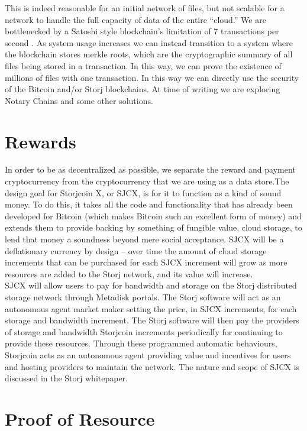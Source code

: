 \documentclass[a4paper,12pt]{article}
\begin{document}
This is indeed reasonable for an initial network of files, but not scalable for a network to handle the full capacity of data of the entire “cloud.” We are bottlenecked by a Satoshi style blockchain’s limitation of 7 transactions per second \cite{14}. As system usage increases we can instead transition to a system where the blockchain stores merkle roots, which are the cryptographic summary of all files being stored in a transaction. In this way, we can prove the existence of millions of files with one transaction. In this way we can directly use the security of the Bitcoin and/or Storj blockchains. At time of writing we are exploring Notary Chains \cite{15} and some other solutions. 

\section*{Rewards}

In order to be as decentralized as possible, we separate the reward and payment cryptocurrency from the cryptocurrency that we are using as a data store.The design goal for Storjcoin X, or SJCX, is for it to function as a kind of sound money.  To do this, it takes all the code and functionality that has already been developed for Bitcoin (which makes Bitcoin such an excellent form of money) and extends them to provide backing by something of fungible value, cloud storage, to lend that money a soundness beyond mere social acceptance. SJCX will be a deflationary currency by design -- over time the amount of cloud storage increments that can be purchased for each SJCX increment will grow as more resources are added to the Storj network, and its value will increase.\\

SJCX will allow users to pay for bandwidth and storage on the Storj distributed storage network through Metadisk portals.  The Storj software will act as an autonomous agent market maker setting the price, in SJCX increments, for each storage and bandwidth increment.  The Storj software will then pay the providers of storage and bandwidth Storjcoin increments periodically for continuing to provide these resources. Through these programmed automatic behaviours, Storjcoin acts as an autonomous agent providing value and incentives for users and hosting providers to maintain the network. The nature and scope of SJCX is discussed in the Storj whitepaper.

\section*{Proof of Resource}
\end{document}
